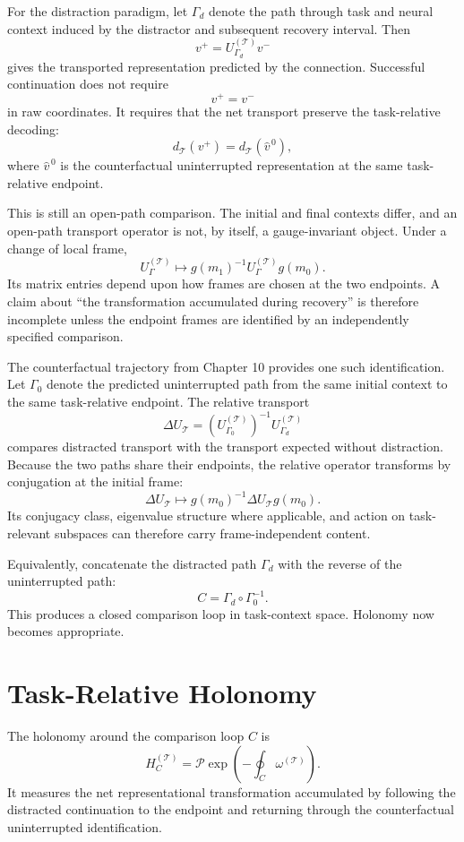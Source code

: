 \documentclass[11pt]{book}
\begin{document}
For the distraction paradigm, let $\Gamma_d$ denote the path through task and neural context induced by the distractor and subsequent recovery interval. Then
\[
v^{+}
=
U_{\Gamma_d}^{(\mathcal T)}v^{-}
\]
gives the transported representation predicted by the connection. Successful continuation does not require
\[
v^{+}=v^{-}
\]
in raw coordinates. It requires that the net transport preserve the task-relative decoding:
\[
d_{\mathcal T}(v^{+})
=
d_{\mathcal T}(\widehat v^{\,0}),
\]
where $\widehat v^{\,0}$ is the counterfactual uninterrupted representation at the same task-relative endpoint.

This is still an open-path comparison. The initial and final contexts differ, and an open-path transport operator is not, by itself, a gauge-invariant object. Under a change of local frame,
\[
U_{\Gamma}^{(\mathcal T)}
\mapsto
g(m_1)^{-1}
U_{\Gamma}^{(\mathcal T)}
g(m_0).
\]
Its matrix entries depend upon how frames are chosen at the two endpoints. A claim about ``the transformation accumulated during recovery'' is therefore incomplete unless the endpoint frames are identified by an independently specified comparison.

The counterfactual trajectory from Chapter 10 provides one such identification. Let $\Gamma_0$ denote the predicted uninterrupted path from the same initial context to the same task-relative endpoint. The relative transport
\[
\Delta U_{\mathcal T}
=
\left(
U_{\Gamma_0}^{(\mathcal T)}
\right)^{-1}
U_{\Gamma_d}^{(\mathcal T)}
\]
compares distracted transport with the transport expected without distraction. Because the two paths share their endpoints, the relative operator transforms by conjugation at the initial frame:
\[
\Delta U_{\mathcal T}
\mapsto
g(m_0)^{-1}
\Delta U_{\mathcal T}
g(m_0).
\]
Its conjugacy class, eigenvalue structure where applicable, and action on task-relevant subspaces can therefore carry frame-independent content.

Equivalently, concatenate the distracted path $\Gamma_d$ with the reverse of the uninterrupted path:
\[
C
=
\Gamma_d\circ\Gamma_0^{-1}.
\]
This produces a closed comparison loop in task-context space. Holonomy now becomes appropriate.

\section*{Task-Relative Holonomy}

The holonomy around the comparison loop $C$ is
\[
H_C^{(\mathcal T)}
=
\mathcal P
\exp\left(
-\oint_C\omega^{(\mathcal T)}
\right).
\]
It measures the net representational transformation accumulated by following the distracted continuation to the endpoint and returning through the counterfactual uninterrupted identification.
\end{document}
